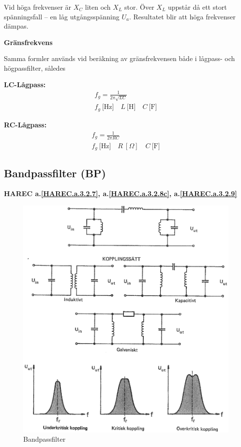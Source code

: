 Vid höga frekvenser är \(X_C\) liten och \(X_L\) stor.
Över \(X_L\) uppstår då ett stort spänningsfall -- en låg utgångsspänning
\(U_a\).
Resultatet blir att höga frekvenser dämpas.

\textbf{Gränsfrekvens}

Samma formler används vid beräkning av gränsfrekvensen både i lågpass- och
högpassfilter, således

\textbf{LC-Lågpass:}
\begin{gather*}
  f_g = \frac{1}{2\pi \sqrt{LC}} \\
  f_g\ \text{[Hz]} \quad L\ \text{[H]} \quad C\ \text{[F]}
\end{gather*}

\textbf{RC-Lågpass:}
\begin{gather*}
  f_g = \frac{1}{2\pi {RC}} \\
  f_g\ \text{[Hz]} \quad R\ [\Omega] \quad C\ \text{[F]}
\end{gather*}

\subsection{Bandpassfilter (BP)}
\textbf{HAREC
  a.\ref{HAREC.a.3.2.7}\label{myHAREC.a.3.2.7},
  a.\ref{HAREC.a.3.2.8c}\label{myHAREC.a.3.2.8c},
  a.\ref{HAREC.a.3.2.9}\label{myHAREC.a.3.2.9c}
}

\begin{figure}
\includegraphics[width=\textwidth]{images/cropped_pdfs/bild_2_3-24.pdf}
\caption{Bandpassfilter}
\label{fig:BildII3-24}
\end{figure}

